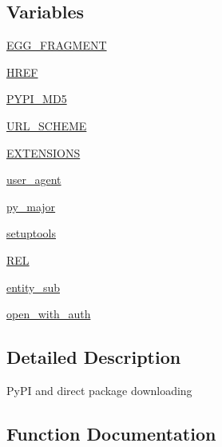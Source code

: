 \subsection*{Variables}
\begin{DoxyCompactItemize}
\item 
\hyperlink{namespacesetuptools_1_1package__index_a2f5b67d5ed3c4e917624dbc584263468}{E\+G\+G\+\_\+\+F\+R\+A\+G\+M\+E\+NT}
\item 
\hyperlink{namespacesetuptools_1_1package__index_aeec62690e1fa7af6285093b19ccb2694}{H\+R\+EF}
\item 
\hyperlink{namespacesetuptools_1_1package__index_a14cf2ee19cf89dda2ab5f74aa01b4397}{P\+Y\+P\+I\+\_\+\+M\+D5}
\item 
\hyperlink{namespacesetuptools_1_1package__index_a7be9f860c747f50bf0ed6d592bf9cd3d}{U\+R\+L\+\_\+\+S\+C\+H\+E\+ME}
\item 
\hyperlink{namespacesetuptools_1_1package__index_acfead277bc15c21bb4fc7a4705a944bf}{E\+X\+T\+E\+N\+S\+I\+O\+NS}
\item 
\hyperlink{namespacesetuptools_1_1package__index_aacea44ab11a7309ff1fd86a484aff2b2}{user\+\_\+agent}
\item 
\hyperlink{namespacesetuptools_1_1package__index_ad58d06ffdbe15da7259a5041f9daa5bb}{py\+\_\+major}
\item 
\hyperlink{namespacesetuptools_1_1package__index_a1501d8e324f54091b5238610e212512a}{setuptools}
\item 
\hyperlink{namespacesetuptools_1_1package__index_a9acf1ac735960defaaa76653cb9a1302}{R\+EL}
\item 
\hyperlink{namespacesetuptools_1_1package__index_afaf551eb72e66c8460ec72bec1bcb7e7}{entity\+\_\+sub}
\item 
\hyperlink{namespacesetuptools_1_1package__index_a464e4111e26745c975b20a839527528d}{open\+\_\+with\+\_\+auth}
\end{DoxyCompactItemize}


\subsection{Detailed Description}
\begin{DoxyVerb}PyPI and direct package downloading\end{DoxyVerb}
 

\subsection{Function Documentation}
\mbox{\label{namespacesetuptools_1_1package__index_a6bc8e55badca04ff77ea91d2bd7786bc}} 
